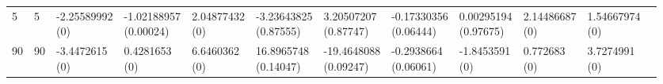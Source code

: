 \documentclass[12pt,a4paper,twoside,openany]{book}
\begin{document}
\begin{table}[ht]
{\begin{tabular}{llllllllllll}
  5 & 5 & \makecell{-2.25589992 \\ (0)} & \makecell{-1.02188957 \\ (0.00024)} & \makecell{2.04877432 \\ (0)} & \makecell{-3.23643825 \\ (0.87555)} & \makecell{3.20507207 \\ (0.87747)} & \makecell{-0.17330356 \\ (0.06444)} & \makecell{0.00295194 \\ (0.97675)} & \makecell{2.14486687 \\ (0)} & \makecell{1.54667974 \\ (0)} &  \\ 
  90 & 90 & \makecell{-3.4472615 \\ (0)} & \makecell{0.4281653 \\ (0)} & \makecell{6.6460362 \\ (0)} & \makecell{16.8965748 \\ (0.14047)} & \makecell{-19.4648088 \\ (0.09247)} & \makecell{-0.2938664 \\ (0.06061)} & \makecell{-1.8453591 \\ (0)} & \makecell{0.772683 \\ (0)} & \makecell{3.7274991 \\ (0)} &  \\ 
   \hline
\end{tabular}}
\end{table}
\end{document}

